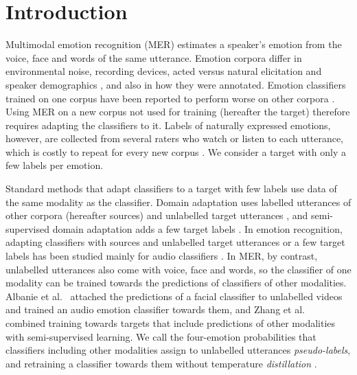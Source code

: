 \section{Introduction}\label{sec:intro}

Multimodal emotion recognition (MER) estimates a speaker's emotion from the voice, face and words of the same utterance. Emotion corpora differ in environmental noise, recording devices, acted versus natural elicitation and speaker demographics \cite{gideon2021addog}, and also in how they were annotated. Emotion classifiers trained on one corpus have been reported to perform worse on other corpora \cite{ryumina2025,gideon2021addog}. Using MER on a new corpus not used for training (hereafter the target) therefore requires adapting the classifiers to it. Labels of naturally expressed emotions, however, are collected from several raters who watch or listen to each utterance, which is costly to repeat for every new corpus \cite{parthasarathy2020ladder,abdelwahab2018dann}. We consider a target with only a few labels per emotion.

Standard methods that adapt classifiers to a target with few labels use data of the same modality as the classifier. Domain adaptation uses labelled utterances of other corpora (hereafter sources) and unlabelled target utterances \cite{ganin2016dann,sun2016coral}, and semi-supervised domain adaptation adds a few target labels \cite{saito2019mme}. In emotion recognition, adapting classifiers with sources and unlabelled target utterances or a few target labels has been studied mainly for audio classifiers \cite{abdelwahab2018dann,gideon2021addog,feng2023}. In MER, by contrast, unlabelled utterances also come with voice, face and words, so the classifier of one modality can be trained towards the predictions of classifiers of other modalities. Albanie et al.\ \cite{albanie2018} attached the predictions of a facial classifier to unlabelled videos and trained an audio emotion classifier towards them, and Zhang et al.\ \cite{zhang2021combining} combined training towards targets that include predictions of other modalities with semi-supervised learning. We call the four-emotion probabilities that classifiers including other modalities assign to unlabelled utterances \emph{pseudo-labels}, and retraining a classifier towards them without temperature \emph{distillation} \cite{hinton2015distilling,albanie2018}.

